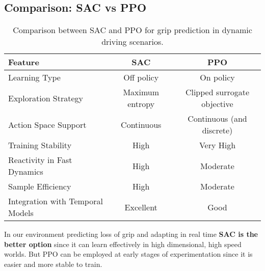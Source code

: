 \documentclass[a4paper,final,12pt]{report}
\begin{document}
\subsection{Comparison: SAC vs PPO}
\begin{table}[ht]
\centering
\begin{tabular}{|l|c|c|}
\hline
\textbf{Feature} & \textbf{SAC} & \textbf{PPO} \\
\hline
Learning Type & Off policy & On policy \\
\hline
Exploration Strategy & Maximum entropy & Clipped surrogate objective \\
\hline
Action Space Support & Continuous & Continuous (and discrete) \\
\hline
Training Stability & High & Very High \\
\hline
Reactivity in Fast Dynamics & High & Moderate \\
\hline
Sample Efficiency & High & Moderate \\
\hline
Integration with Temporal Models & Excellent & Good \\
\hline
\end{tabular}
\caption{Comparison between SAC and PPO for grip prediction in dynamic driving scenarios.}
\end{table}

\noindent In our environment predicting loss of grip and adapting in real time \textbf{SAC is the better option} since it can learn effectively in high dimensional, high speed worlds. But PPO can be employed at early stages of experimentation since it is easier and more stable to train.
\end{document}

